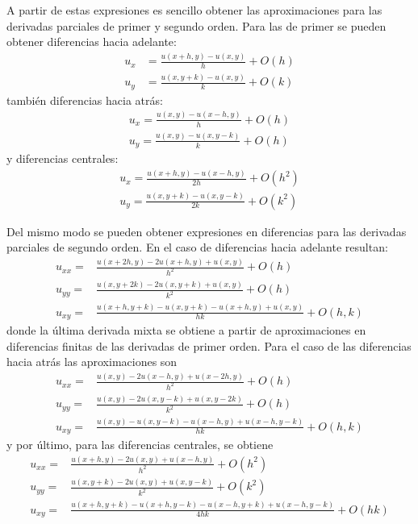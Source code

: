  A partir de estas expresiones es sencillo obtener las aproximaciones para las derivadas parciales de primer y segundo orden. Para las de primer se pueden obtener diferencias hacia adelante:
\begin{align*}
 u_x &= \frac{u(x + h, y) - u(x,y)}{h} + O(h) \\
 u_y &= \frac{u(x, y + k) - u(x,y)}{k} + O(k)
\end{align*}
también diferencias hacia atrás:
\begin{align*}
 u_x = \frac{u(x,y) - u(x-h,y)}{h} + O(h) \\
 u_y = \frac{u(x,y) - u(x,y-k)}{k} + O(h) 
\end{align*}
y diferencias centrales:
\begin{align*}
 u_x = \frac{u(x+h, y) - u(x-h,y)}{2 h} + O(h^2) \\
 u_y = \frac{u(x, y +k) - u(x,y -k)}{2 k} + O(k^2)
\end{align*}

Del mismo modo se pueden obtener expresiones en diferencias para las derivadas parciales de segundo orden. En el caso de diferencias hacia adelante resultan:
\begin{align*}
 u_{xx} =& \frac{u(x+2h, y) -2u(x+h, y) + u(x,y)}{h^2} + O(h) \\
 u_{yy} =& \frac{u(x, y+2k) -2u(x, y+k) + u(x,y)}{k^2} + O(h) \\
 u_{xy} =& \frac{u(x+h, y+k) - u(x, y+k) -u(x+h, y) + u(x, y)}{hk} + O(h, k)
\end{align*}
donde la última derivada mixta se obtiene a partir de aproximaciones en diferencias finitas de las derivadas de primer orden. Para el caso de las diferencias hacia atrás las aproximaciones son
\begin{align*}
 u_{xx} =& \frac{u(x, y) - 2u(x - h, y) + u(x -2h,y)}{h^2} + O(h) \\
 u_{yy} =& \frac{u(x, y) - 2u(x, y - k) + u(x,y -2k)}{k^2} + O(h) \\
 u_{xy} =& \frac{u(x, y) - u(x, y - k) - u(x - h, y) + u(x - h, y - k)}{hk} + O(h, k)
\end{align*}
y por último, para las diferencias centrales, se obtiene
\begin{align*}
 u_{xx} =& \frac{u(x + h, y) - 2 u(x, y) + u(x-h, y)}{h^2} + O(h^2) \\
 u_{yy} =& \frac{u(x, y + k) - 2 u(x, y) + u(x, y - k)}{k^2} + O(k^2) \\
 u_{xy} =& \frac{u(x+h, y+k) - u(x+h, y-k) -u(x-h, y+k) + u(x-h, y-k)}{4 h k} + O(hk)
\end{align*}

